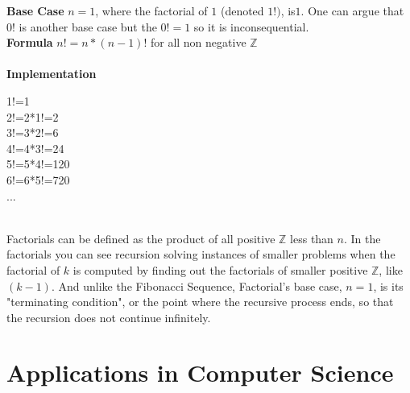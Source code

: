 \documentclass{article}
\begin{document}
{\bf Base Case} $n=1$, where the factorial of $1$ (denoted $1!)$, is$ 1$.
One can argue that $0!$ is another base case but the $0!=1$ so it is inconsequential. 
\\
{\bf Formula} $n! = n * (n-1)!$ for all non negative $\mathbb{Z}$ 
\\
~\\
{\bf Implementation} \\
\begin{center}
	1!=1
	\\
	2!=2*1!=2
	\\
	3!=3*2!=6
	\\
	4!=4*3!=24
	\\
	5!=5*4!=120
	\\
	6!=6*5!=720
	\\
	...

\end{center}
~\\
Factorials can be defined as the product of all positive $\mathbb{Z}$ less than $n$. In the factorials you can see recursion solving instances of smaller problems when the factorial of $k$ is computed by finding out the factorials of smaller positive $\mathbb{Z}$, like $(k-1)$. And unlike the Fibonacci Sequence, Factorial's base case, $n=1$, is its "terminating condition", or the point where the recursive process ends, so that the recursion does not continue infinitely.  
~\\
\section{Applications in Computer Science}
\end{document}
